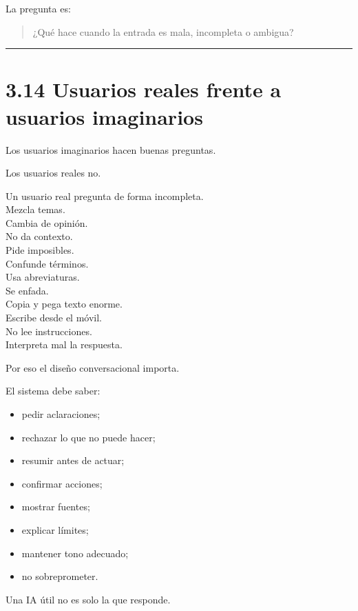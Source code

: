La pregunta es:

\begin{quote}
¿Qué hace cuando la entrada es mala, incompleta o ambigua?
\end{quote}

\begin{center}\rule{0.5\linewidth}{0.5pt}\end{center}

\section{3.14 Usuarios reales frente a usuarios
imaginarios}\label{usuarios-reales-frente-a-usuarios-imaginarios}

Los usuarios imaginarios hacen buenas preguntas.

Los usuarios reales no.

Un usuario real pregunta de forma incompleta.\\
Mezcla temas.\\
Cambia de opinión.\\
No da contexto.\\
Pide imposibles.\\
Confunde términos.\\
Usa abreviaturas.\\
Se enfada.\\
Copia y pega texto enorme.\\
Escribe desde el móvil.\\
No lee instrucciones.\\
Interpreta mal la respuesta.

Por eso el diseño conversacional importa.

El sistema debe saber:

\begin{itemize}
\tightlist
\item
  pedir aclaraciones;
\item
  rechazar lo que no puede hacer;
\item
  resumir antes de actuar;
\item
  confirmar acciones;
\item
  mostrar fuentes;
\item
  explicar límites;
\item
  mantener tono adecuado;
\item
  no sobreprometer.
\end{itemize}

Una IA útil no es solo la que responde.

